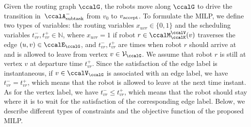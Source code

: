 \documentclass[Afour,sageh,times]{sagej}
\newcommand{\auto}[1]{\ccalA_{\textup{#1}}}
\newcommand{\vertex}[1]{v_{\textup{#1}}}
\begin{document}
Given the routing graph $\ccalG$, the robots move along $\ccalG$ to drive the transition in~$\auto{subtask}^-$ from $v_0$ to $\vertex{\text{accept}}$. To formulate the MILP, we define two types of variables: the routing variables $x_{uvr} \in\{0, 1\}$ and the scheduling variables $t^-_{vr}, t^+_{vr} \in \mathbb{N}$, where $x_{uvr}=1$  if robot  $r\in \ccalM^\ccalV_\ccalK(v)$ traverses the edge $(u,v) \in \ccalE_\ccalG$, and $t^-_{vr}, t^+_{vr}$ are times when robot $r$ should arrive at and is allowed to leave from vertex $v \in \mathcal{V}_\ccalG$. We assume that robot $r$ is still at vertex $v$ at departure time $t^+_{vr}$. Since the satisfaction of the edge label is instantaneous, if $v \in \ccalV_\ccalG$ is associated with an edge label, we have
  $t_{vr}^- = t_{vr}^+$, which means that the robot is allowed to leave at the next time instant. As for the vertex label, we have $t_{vr}^-  \leq t_{vr}^+$, which means that the robot should stay where it is to wait for the satisfaction of the corresponding edge label. Below, we describe  different types of constraints and the objective function of the proposed MILP.
\end{document}
